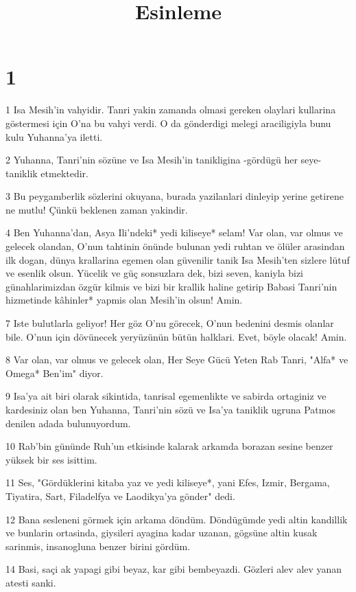 

\title{Esinleme}


\chapter{1}

\par 1 Isa Mesih'in vahyidir. Tanri yakin zamanda olmasi gereken olaylari kullarina göstermesi için O'na bu vahyi verdi. O da gönderdigi melegi araciligiyla bunu kulu Yuhanna'ya iletti.
\par 2 Yuhanna, Tanri'nin sözüne ve Isa Mesih'in tanikligina -gördügü her seye- taniklik etmektedir.
\par 3 Bu peygamberlik sözlerini okuyana, burada yazilanlari dinleyip yerine getirene ne mutlu! Çünkü beklenen zaman yakindir.
\par 4 Ben Yuhanna'dan, Asya Ili'ndeki* yedi kiliseye* selam! Var olan, var olmus ve gelecek olandan, O'nun tahtinin önünde bulunan yedi ruhtan ve ölüler arasindan ilk dogan, dünya krallarina egemen olan güvenilir tanik Isa Mesih'ten sizlere lütuf ve esenlik olsun. Yücelik ve güç sonsuzlara dek, bizi seven, kaniyla bizi günahlarimizdan özgür kilmis ve bizi bir krallik haline getirip Babasi Tanri'nin hizmetinde kâhinler* yapmis olan Mesih'in olsun! Amin.
\par 7 Iste bulutlarla geliyor! Her göz O'nu görecek, O'nun bedenini desmis olanlar bile. O'nun için dövünecek yeryüzünün bütün halklari. Evet, böyle olacak! Amin.
\par 8 Var olan, var olmus ve gelecek olan, Her Seye Gücü Yeten Rab Tanri, "Alfa* ve Omega* Ben'im" diyor.
\par 9 Isa'ya ait biri olarak sikintida, tanrisal egemenlikte ve sabirda ortaginiz ve kardesiniz olan ben Yuhanna, Tanri'nin sözü ve Isa'ya taniklik ugruna Patmos denilen adada bulunuyordum.
\par 10 Rab'bin gününde Ruh'un etkisinde kalarak arkamda borazan sesine benzer yüksek bir ses isittim.
\par 11 Ses, "Gördüklerini kitaba yaz ve yedi kiliseye*, yani Efes, Izmir, Bergama, Tiyatira, Sart, Filadelfya ve Laodikya'ya gönder" dedi.
\par 12 Bana sesleneni görmek için arkama döndüm. Döndügümde yedi altin kandillik ve bunlarin ortasinda, giysileri ayagina kadar uzanan, gögsüne altin kusak sarinmis, insanogluna benzer birini gördüm.
\par 14 Basi, saçi ak yapagi gibi beyaz, kar gibi bembeyazdi. Gözleri alev alev yanan atesti sanki.
